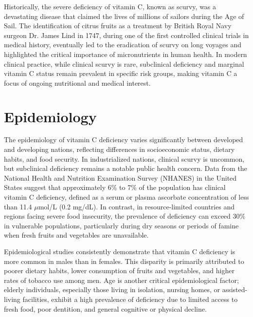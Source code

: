 Historically, the severe deficiency of vitamin C, known as scurvy, was a devastating disease that claimed the lives of millions of sailors during the Age of Sail. The identification of citrus fruits as a treatment by British Royal Navy surgeon Dr. James Lind in 1747, during one of the first controlled clinical trials in medical history, eventually led to the eradication of scurvy on long voyages and highlighted the critical importance of micronutrients in human health. In modern clinical practice, while clinical scurvy is rare, subclinical deficiency and marginal vitamin C status remain prevalent in specific risk groups, making vitamin C a focus of ongoing nutritional and medical interest.

\section*{Epidemiology}
The epidemiology of vitamin C deficiency varies significantly between developed and developing nations, reflecting differences in socioeconomic status, dietary habits, and food security. In industrialized nations, clinical scurvy is uncommon, but subclinical deficiency remains a notable public health concern. Data from the National Health and Nutrition Examination Survey (NHANES) in the United States suggest that approximately 6\% to 7\% of the population has clinical vitamin C deficiency, defined as a serum or plasma ascorbate concentration of less than 11.4 $\mu$mol/L (0.2 mg/dL). In contrast, in resource-limited countries and regions facing severe food insecurity, the prevalence of deficiency can exceed 30\% in vulnerable populations, particularly during dry seasons or periods of famine when fresh fruits and vegetables are unavailable.

Epidemiological studies consistently demonstrate that vitamin C deficiency is more common in males than in females. This disparity is primarily attributed to poorer dietary habits, lower consumption of fruits and vegetables, and higher rates of tobacco use among men. Age is another critical epidemiological factor; elderly individuals, especially those living in isolation, nursing homes, or assisted-living facilities, exhibit a high prevalence of deficiency due to limited access to fresh food, poor dentition, and general cognitive or physical decline.

